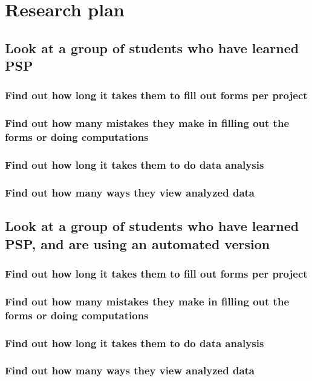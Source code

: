 \chapter{Research plan}
\section{Look at a group of students who have learned PSP}
\subsection{Find out how long it takes them to fill out forms per project}
\subsection{Find out how many mistakes they make in filling out the forms or doing computations}
\subsection{Find out how long it takes them to do data analysis}
\subsection{Find out how many ways they view analyzed data}
\section{Look at a group of students who have learned PSP, and are using an automated version}
\subsection{Find out how long it takes them to fill out forms per project}
\subsection{Find out how many mistakes they make in filling out the forms or doing computations}
\subsection{Find out how long it takes them to do data analysis}
\subsection{Find out how many ways they view analyzed data}

